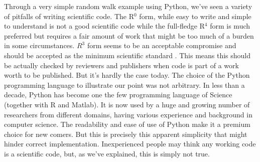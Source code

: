 \documentclass[a4paper,11pt]{article}
\begin{document}
Through a very simple random walk example using Python, we've seen a variety of pitfalls of writing scientific code. The R$^0$ form, while easy to write and simple to understand is not a good scientific code while the full-fledge R$^{4}$ form is much preferred but requires a fair amount of work that might be too much of a burden in some circumstances. $R^3$ form seems to be an acceptable compromise and should be accepted as the minimum scientific standard \citep{Wilson:2017}. This means this should be actually checked by reviewers and publishers when code is part of a work worth to be published. But it's hardly the case today.
%
The choice of the Python programming language to illustrate our point was not arbitrary. In less than a decade, Python has become one the few programming language of Science (together with R and Matlab). It is now used by a huge and growing number of researchers from different domains, having various experience and background in computer science. The readability and ease of use of Python make it a premium choice for new comers. But this is precisely this apparent simplicity that might hinder correct implementation. Inexperienced people may think any working code is a scientific code, but, as we've explained, this is simply not true.




\renewcommand*{\bibfont}{\small}
\printbibliography[title=References]


\end{document}
